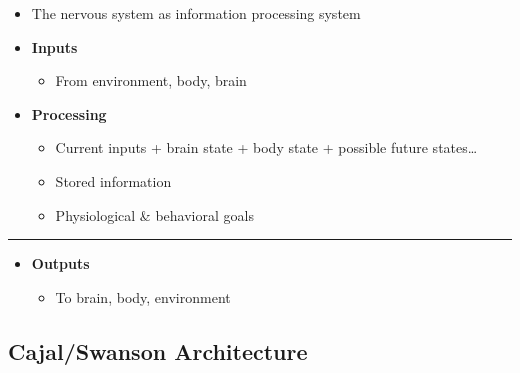 \documentclass[]{article}
\providecommand{\tightlist}{%
  \setlength{\itemsep}{0pt}\setlength{\parskip}{0pt}}
\begin{document}
\begin{itemize}
\tightlist
\item
  The nervous system as information processing system
\item
  \textbf{Inputs}

  \begin{itemize}
  \tightlist
  \item
    From environment, body, brain
  \end{itemize}
\item
  \textbf{Processing}

  \begin{itemize}
  \tightlist
  \item
    Current inputs + brain state + body state + possible future
    states\ldots{}
  \item
    Stored information
  \item
    Physiological \& behavioral goals
  \end{itemize}
\end{itemize}

\begin{center}\rule{0.5\linewidth}{\linethickness}\end{center}

\begin{itemize}
\tightlist
\item
  \textbf{Outputs}

  \begin{itemize}
  \tightlist
  \item
    To brain, body, environment
  \end{itemize}
\end{itemize}

\subsection{Cajal/Swanson Architecture}\label{cajalswanson-architecture}
\end{document}
